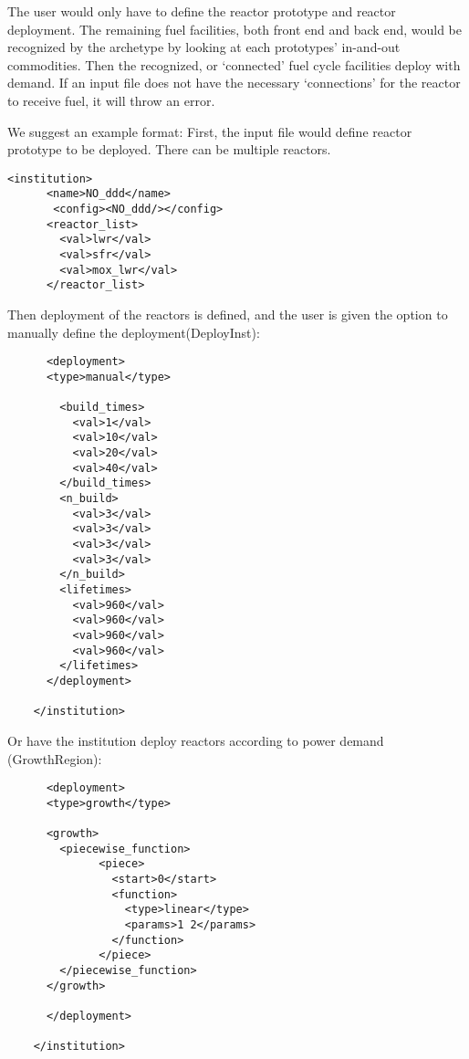 \documentclass[12pt,letterpaper]{article}
\begin{document}
The user would only have to define the reactor prototype and reactor deployment. 
The remaining fuel facilities,
both front end and back end, would be recognized by the archetype
by looking at each prototypes' in-and-out commodities.
Then the recognized, or `connected' fuel cycle facilities deploy
with demand.
If an input file does not have the necessary `connections' for the 
reactor to receive fuel, it will throw an error. 

We suggest an example format:
First, the input file would define reactor prototype to be deployed. There can be multiple reactors.

\begin{verbatim}
<institution>
      <name>NO_ddd</name>
       <config><NO_ddd/></config>
      <reactor_list>
        <val>lwr</val>
        <val>sfr</val>
        <val>mox_lwr</val>
      </reactor_list>
\end{verbatim}

Then deployment of the reactors is defined, and the user
is given the option to manually define the deployment(DeployInst):
\begin{verbatim}
      <deployment>
      <type>manual</type>

        <build_times>
          <val>1</val>
          <val>10</val>
          <val>20</val>
          <val>40</val>
        </build_times>
        <n_build>
          <val>3</val>
          <val>3</val>
          <val>3</val>
          <val>3</val>
        </n_build>
        <lifetimes>
          <val>960</val>
          <val>960</val>
          <val>960</val>
          <val>960</val>
        </lifetimes>
      </deployment>

    </institution>
\end{verbatim}

Or have the institution deploy reactors according to power demand (GrowthRegion):

\begin{verbatim}
      <deployment>
      <type>growth</type>

      <growth>
        <piecewise_function>
              <piece>
                <start>0</start>
                <function>
                  <type>linear</type>
                  <params>1 2</params>
                </function>
              </piece>
        </piecewise_function>
      </growth>
      
      </deployment>

    </institution>
\end{verbatim}
\end{document}
